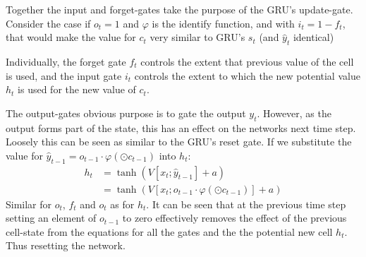 \documentclass[12pt,parskip]{komatufte}
\begin{document}
Together the input and forget-gates take the purpose of the GRU's update-gate.
Consider the case if $o_t=1$ and $\varphi$ is the identify function,
and with $i_t=1-f_t$, that would make the value for $c_t$ very similar to GRU's $s_t$ (and $\hat{y}_t$ identical)

Individually, the forget gate $f_t$ controls the extent that previous value of the cell is used,
and the input gate $i_t$ controls the extent to which the new potential value $h_t$ is used for the new value of $c_t$.

The output-gates obvious purpose is to gate the output $y_t$.
However, as the output forms part of the state,
this has an effect on the networks next time step.
Loosely this can be seen as similar to the GRU's reset gate.
If we substitute the value for $\hat{y}_{t-1} = o_{t-1}\cdot\varphi(\odot c_{t-1})$
into $h_t$:
\begin{align}
h_t &= \tanh \left( V[x_t; \hat{y}_{t-1}] + a \right) \\
&=\tanh \left( V[x_t; o_{t-1}\cdot\varphi(\odot c_{t-1})] + a \right)
\end{align}
Similar for $o_t$, $f_t$ and $o_t$ as for $h_t$.
It can be seen that at the previous time step setting an element of $o_{t-1}$ to zero effectively removes the effect of the previous cell-state from the equations for all the gates and the the potential new cell $h_t$.
Thus resetting the network.
\end{document}
